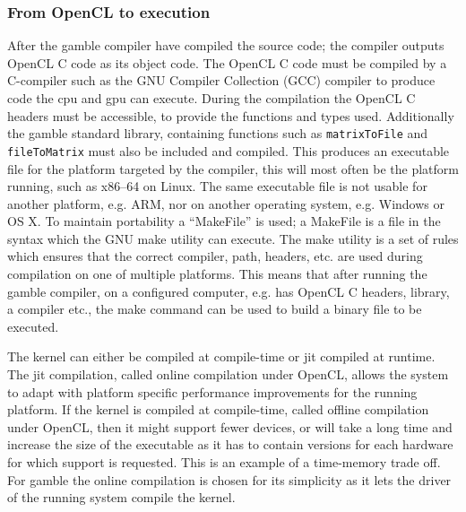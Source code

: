 \subsubsection*{From OpenCL to execution}\label{ssub:makefile}
After the \gls{gamble} compiler have compiled the source code; the compiler outputs OpenCL C code as its object code.
The OpenCL C code must be compiled by a C-compiler such as the GNU Compiler Collection (GCC) compiler to produce code the \acrshort{cpu} and \acrshort{gpu} can execute.
During the compilation the OpenCL C headers must be accessible, to provide the functions and types used. 
Additionally the \gls{gamble} standard library, containing functions such as \texttt{matrixToFile} and \texttt{fileToMatrix} must also be included and compiled. 
This produces an executable file for the platform targeted by the compiler, this will most often be the platform running, such as x86--64 on Linux.
The same executable file is not usable for another platform, e.g. ARM, nor on another operating system, e.g. Windows or OS X.
To maintain portability a ``MakeFile'' is used; a MakeFile is a file in the syntax which the GNU make utility can execute. 
The make utility is a set of rules which ensures that the correct compiler, path, headers, etc. are used during compilation on one of multiple platforms. 
This means that after running the \gls{gamble} compiler, on a configured computer, e.g. has OpenCL C headers, library, a compiler etc., the make command can be used to build a binary file to be executed.

The kernel can either be compiled at compile-time or \acrshort{jit} compiled at runtime.
The \acrshort{jit} compilation, called online compilation under OpenCL, allows the system to adapt with platform specific performance improvements for the running platform.
If the kernel is compiled at compile-time, called offline compilation under OpenCL, then it might support fewer devices, or will take a long time and increase the size of the executable as it has to contain versions for each hardware for which support is requested. \citep{openclbookjit}
This is an example of a time-memory trade off. 
For \gls{gamble} the online compilation is chosen for its simplicity as it lets the driver of the running system compile the kernel. 

